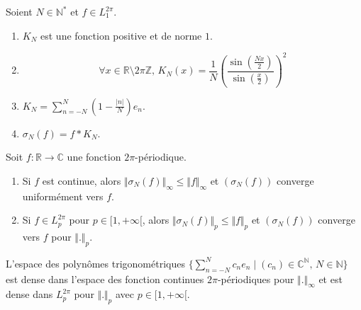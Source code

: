   \begin{proposition}
    Soient $N \in \mathbb{N}^*$ et $f \in L_1^{2 \pi}$.
    \begin{enumerate}[label=(\roman*)]
      \item $K_N$ est une fonction positive et de norme $1$.
      \item \[ \forall x \in \mathbb{R} \setminus 2 \pi \mathbb{Z}, \, K_N(x) = \frac{1}{N} \left(\frac{\sin \left( \frac{Nx}{2} \right)}{\sin \left( \frac{x}{2} \right)}\right)^2 \]
      \item $K_N = \sum_{n=-N}^{N} \left(1 - \frac{\vert n \vert}{N}\right) e_n$.
      \item $\sigma_N(f) = f * K_N$.
    \end{enumerate}
  \end{proposition}


  \begin{theorem}[Fejér]
    Soit $f : \mathbb{R} \rightarrow \mathbb{C}$ une fonction $2\pi$-périodique.
    \begin{enumerate}[label=(\roman*)]
      \item Si $f$ est continue, alors $\Vert \sigma_N(f) \Vert_\infty \leq \Vert f \Vert_\infty$ et $(\sigma_N(f))$ converge uniformément vers $f$.
      \item Si $f \in L_p^{2\pi}$ pour $p \in [1,+\infty[$, alors $\Vert \sigma_N(f) \Vert_p \leq \Vert f \Vert_p$ et $(\sigma_N(f))$ converge vers $f$ pour $\Vert . \Vert_p$.
    \end{enumerate}
  \end{theorem}

  \begin{corollary}
    L'espace des polynômes trigonométriques $\{ \sum_{n=-N}^N c_n e_n \mid (c_n) \in \mathbb{C}^{\mathbb{N}}, \, N \in \mathbb{N} \}$ est dense dans l'espace des fonction continues $2\pi$-périodiques pour $\Vert . \Vert_\infty$ et est dense dans $L_p^{2\pi}$ pour $\Vert . \Vert_p$ avec $p \in [1,+\infty[$.
  \end{corollary}

